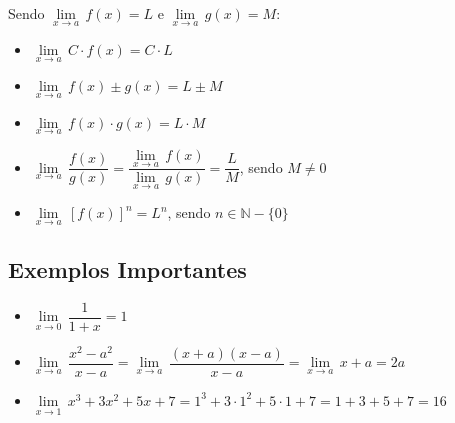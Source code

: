 \documentclass[12pt]{article}
\newcommand{\limit}[2]{\lim\limits_{x\rightarrow #1}\,#2}
\begin{document}
Sendo $\limit{a}{f(x)} = L$ e $\limit{a}{g(x)} = M$:

\begin{itemize}
\item $\limit{a}{C \cdot f(x)} = C \cdot L$
\item $\limit{a}{f(x)\pm g(x)} = L \pm M$
\item $\limit{a}{f(x) \cdot g(x)} = L \cdot M$
\item $\limit{a}{\dfrac{f(x)}{g(x)}} = \dfrac{\limit{a}{f(x)}}{\limit{a}{g(x)}} = \dfrac{L}{M}$, sendo $M \neq 0$
\item $\limit{a}{[f(x)]^n} = L^n$, sendo $n \in \mathbb{N}-\{0\}$
\end{itemize}

\subsection{Exemplos Importantes}

\begin{itemize}
\item $\limit{0}{\dfrac{1}{1+x}} = 1$
\item $\limit{a}{\dfrac{x^2-a^2}{x-a}} = \limit{a}{\dfrac{(x+a)(x-a)}{x-a}} = \limit{a}{x+a} = 2a$
\item $\limit{1}{x^3+3x^2+5x+7} = 1^3+3 \cdot 1^2+5 \cdot 1+7 = 1 + 3 + 5 + 7 = 16$
\end{itemize}
\end{document}
